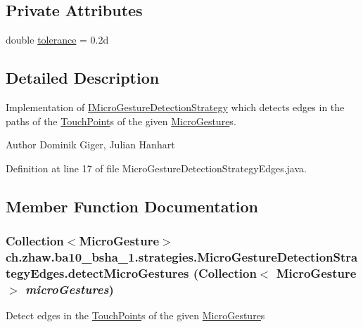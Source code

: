 \subsection*{Private Attributes}
\begin{DoxyCompactItemize}
\item 
double \hyperlink{classch_1_1zhaw_1_1ba10__bsha__1_1_1strategies_1_1MicroGestureDetectionStrategyEdges_a17536b25d63e07e0c5c776e017a4b29c}{tolerance} = 0.2d
\end{DoxyCompactItemize}


\subsection{Detailed Description}
Implementation of \hyperlink{interfacech_1_1zhaw_1_1ba10__bsha__1_1_1strategies_1_1IMicroGestureDetectionStrategy}{IMicroGestureDetectionStrategy} which detects edges in the paths of the \hyperlink{classch_1_1zhaw_1_1ba10__bsha__1_1_1TouchPoint}{TouchPoint}s of the given \hyperlink{}{MicroGesture}s.

\begin{DoxyAuthor}{Author}
Dominik Giger, Julian Hanhart 
\end{DoxyAuthor}


Definition at line 17 of file MicroGestureDetectionStrategyEdges.java.

\subsection{Member Function Documentation}
\hypertarget{classch_1_1zhaw_1_1ba10__bsha__1_1_1strategies_1_1MicroGestureDetectionStrategyEdges_a16cd0b9ef604ba14a7eb573a77966c4f}{
\subsubsection[{detectMicroGestures}]{\setlength{\rightskip}{0pt plus 5cm}Collection$<${\bf MicroGesture}$>$ ch.zhaw.ba10\_\-bsha\_\-1.strategies.MicroGestureDetectionStrategyEdges.detectMicroGestures (Collection$<$ {\bf MicroGesture} $>$ {\em microGestures})}}
\label{classch_1_1zhaw_1_1ba10__bsha__1_1_1strategies_1_1MicroGestureDetectionStrategyEdges_a16cd0b9ef604ba14a7eb573a77966c4f}
Detect edges in the \hyperlink{classch_1_1zhaw_1_1ba10__bsha__1_1_1TouchPoint}{TouchPoint}s of the given \hyperlink{}{MicroGesture}s


